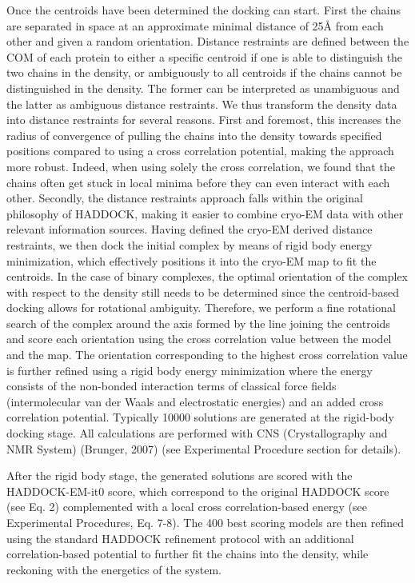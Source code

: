 Once the centroids have been determined the docking can start. First the chains are separated in space at an approximate minimal distance of 25Å from each other and given a random orientation. 
Distance restraints are defined between the COM of each protein to either a specific centroid if one is able to distinguish the two chains in the density, or ambiguously to all centroids if the chains cannot be distinguished in the density. 
The former can be interpreted as unambiguous and the latter as ambiguous distance restraints. We thus transform the density data into distance restraints for several reasons. 
First and foremost, this increases the radius of convergence of pulling the chains into the density towards specified positions compared to using a cross correlation potential, making the approach more robust. 
Indeed, when using solely the cross correlation, we found that the chains often get stuck in local minima before they can even interact with each other. 
Secondly, the distance restraints approach falls within the original philosophy of HADDOCK, making it easier to combine cryo-EM data with other relevant information sources. Having defined the cryo-EM derived distance restraints, we then dock the initial complex by means of rigid body energy minimization, which effectively positions it into the cryo-EM map to fit the centroids. 
In the case of binary complexes, the optimal orientation of the complex with respect to the density still needs to be determined since the centroid-based docking allows for rotational ambiguity. 
Therefore, we perform a fine rotational search of the complex around the axis formed by the line joining the centroids and score each orientation using the cross correlation value between the model and the map. 
The orientation corresponding to the highest cross correlation value is further refined using a rigid body energy minimization where the energy consists of the non-bonded interaction terms of classical force fields (intermolecular van der Waals and electrostatic energies) and an added cross correlation potential. 
Typically 10000 solutions are generated at the rigid-body docking stage. All calculations are performed with CNS (Crystallography and NMR System) (Brunger, 2007) (see Experimental Procedure section for details).

After the rigid body stage, the generated solutions are scored with the HADDOCK-EM-it0 score, which correspond to the original HADDOCK score (see Eq. 2) complemented with a local cross correlation-based energy (see Experimental Procedures, Eq. 7-8). 
The 400 best scoring models are then refined using the standard HADDOCK refinement protocol with an additional correlation-based potential to further fit the chains into the density, while reckoning with the energetics of the system. 

